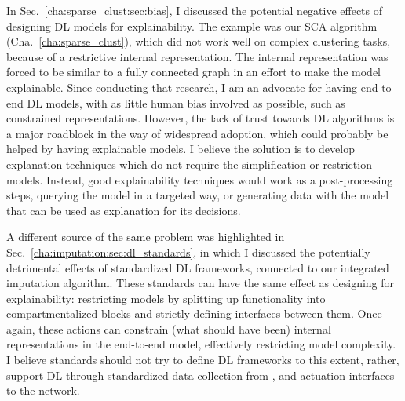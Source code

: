 			In Sec.~\ref{cha:sparse_clust:sec:bias}, I discussed the potential negative effects of designing \ac{DL} models for explainability.
			The example was our \ac{SCA} algorithm (Cha.~\ref{cha:sparse_clust}), which did not work well on complex clustering tasks, because of a restrictive internal representation.
			The internal representation was forced to be similar to a fully connected graph in an effort to make the model explainable.
			Since conducting that research, I am an advocate for having end-to-end \ac{DL} models, with as little human bias involved as possible, such as constrained representations.
			However, the lack of trust towards \ac{DL} algorithms is a major roadblock in the way of widespread adoption, which could probably be helped by having explainable models.
			I believe the solution is to develop explanation techniques which do not require the simplification or restriction models.
			Instead, good explainability techniques would work as a post-processing steps, querying the model in a targeted way, or generating data with the model that can be used as explanation for its decisions.
					
			A different source of the same problem was highlighted in Sec.~\ref{cha:imputation:sec:dl_standards}, in which I discussed the potentially detrimental effects of standardized \ac{DL} frameworks, connected to our integrated imputation algorithm.
			These standards can have the same effect as designing for explainability: restricting models by splitting up functionality into compartmentalized blocks and strictly defining interfaces between them.
			Once again, these actions can constrain (what should have been) internal representations in the end-to-end model, effectively restricting model complexity.
			I believe standards should not try to define \ac{DL} frameworks to this extent, rather, support \ac{DL} through standardized data collection from-, and actuation interfaces to the network.
			
